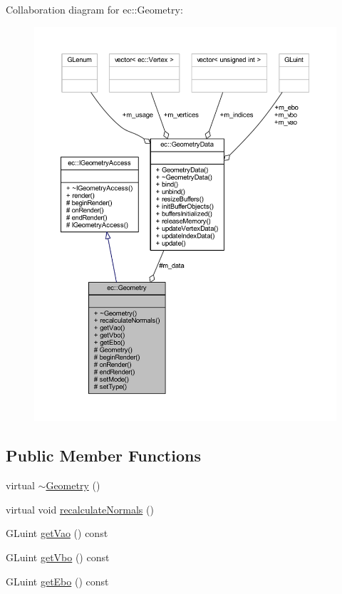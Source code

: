 Collaboration diagram for ec\+:\+:Geometry\+:\nopagebreak
\begin{figure}[H]
\begin{center}
\leavevmode
\includegraphics[width=350pt]{classec_1_1_geometry__coll__graph}
\end{center}
\end{figure}
\subsection*{Public Member Functions}
\begin{DoxyCompactItemize}
\item 
virtual \mbox{\hyperlink{classec_1_1_geometry_a964c581313da2be51a3c78d3be7f48b3}{$\sim$\+Geometry}} ()
\item 
virtual void \mbox{\hyperlink{classec_1_1_geometry_a228d4a0fa01a17379f24aee2c769b501}{recalculate\+Normals}} ()
\item 
G\+Luint \mbox{\hyperlink{classec_1_1_geometry_a91a89baad39d4f2b2c4e9774d952dce9}{get\+Vao}} () const
\item 
G\+Luint \mbox{\hyperlink{classec_1_1_geometry_abad5d4311d16462099b8f9d084d99dd4}{get\+Vbo}} () const
\item 
G\+Luint \mbox{\hyperlink{classec_1_1_geometry_a5d956ff01a7b6648ede8982e0a461ae0}{get\+Ebo}} () const
\end{DoxyCompactItemize}
